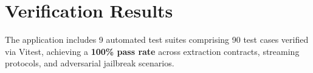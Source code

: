 \documentclass[11pt,a4paper]{article}
\begin{document}
\section{Verification Results}
The application includes 9 automated test suites comprising 90 test cases verified via Vitest, achieving a \textbf{100\% pass rate} across extraction contracts, streaming protocols, and adversarial jailbreak scenarios.
\end{document}
